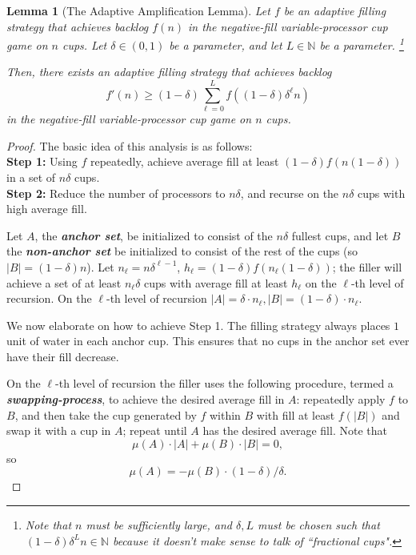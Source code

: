 \documentclass[twocolumn]{article}[10pt]
\newcommand{\defn}[1]{{\textit{\textbf{\boldmath #1}}}\xspace}
\newtheorem{lemma}{Lemma}
\begin{document}
\begin{lemma}[The Adaptive Amplification Lemma]\label{lem:adaptiveAmplification}
  Let $f$ be an adaptive filling strategy that achieves backlog $f(n)$ in the
  negative-fill variable-processor cup game on $n$ cups.
  Let $\delta\in(0,1)$ be a parameter, and let $L\in\mathbb{N}$ be a parameter.
  \footnote{Note that $n$ must be sufficiently large, and $\delta, L$ must be
  chosen such that $(1-\delta)\delta^L n \in \mathbb{N}$ because it doesn't
  make sense to talk of ``fractional cups".}

  Then, there exists an adaptive filling strategy that achieves backlog 
  $$f'(n) \ge (1-\delta)\sum_{\ell= 0}^{L} f((1-\delta)\delta^\ell n)$$
  in the negative-fill variable-processor cup game on $n$ cups.
\end{lemma}
\begin{proof}
  The basic idea of this analysis is as follows:\\
  \textbf{Step 1:} Using $f$ repeatedly, achieve average fill at least
  $(1-\delta) f(n(1-\delta))$ in a set of $n\delta$ cups. \\
  \textbf{Step 2:} Reduce the number of processors to $n\delta$, and recurse
  on the $n\delta$ cups with high average fill.

  Let $A$, the \defn{anchor set}, be initialized to consist of the $n\delta$
  fullest cups, and let $B$ the \defn{non-anchor set} be initialized to consist
  of the rest of the cups (so $|B| = (1-\delta)n$).
  Let $n_\ell = n\delta^{\ell-1}$, $h_\ell = (1-\delta)f(n_\ell(1-\delta))$;
  the filler will achieve a set of at least $n_\ell \delta$ cups with average
  fill at least $h_\ell$ on the $\ell$-th
  level of recursion. On the $\ell$-th level of recursion $|A| = \delta\cdot
  n_\ell, |B| = (1-\delta)\cdot n_\ell$.

  We now elaborate on how to achieve Step 1.
  The filling strategy always places $1$ unit of water in each anchor cup. This
  ensures that no cups in the anchor set ever have their fill decrease.

  On the $\ell$-th level of recursion the filler uses the following procedure,
  termed a \defn{swapping-process}, to achieve the desired average fill in $A$:
  repeatedly apply $f$ to $B$, and then take the cup generated by $f$ within
  $B$ with fill at least $f(|B|)$ and swap it with a cup in $A$; repeat until $A$ has
  the desired average fill. Note that $$\mu(A) \cdot |A| +\mu(B)\cdot |B| =
  0,$$ so $$\mu(A) = - \mu(B) \cdot (1-\delta)/ \delta.$$


\end{proof}
\end{document}
